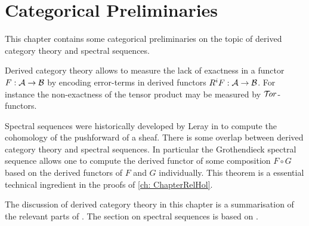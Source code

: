 \chapter{Categorical Preliminaries}\label{ch: ChapterCategory}
This chapter contains some categorical preliminaries on the topic of derived category theory and spectral sequences.

Derived category theory allows to measure the lack of exactness in a functor $F:\AA \to \mathcal{B}$ by encoding error-terms in derived functors $R^iF:\AA \to \mathcal{B}$.
For instance the non-exactness of the tensor product may be measured by $\Tor$-functors.

Spectral sequences were historically developed by Leray in to compute the cohomology of the pushforward of a sheaf.
There is some overlap between derived category theory and spectral sequences.
In particular the Grothendieck spectral sequence allows one to compute the derived functor of some composition $F\circ G$ based on the derived functors of $F$ and $G$ individually.
This theorem is a essential technical ingredient in the proofs of \cref{ch: ChapterRelHol}.

The discussion of derived category theory in this chapter is a summarisation of the relevant parts of \cite[Chapters 1, 2 and 5]{dimca2004sheaves}.
The section on spectral sequences is based on \cite{weibel1995introduction}.
